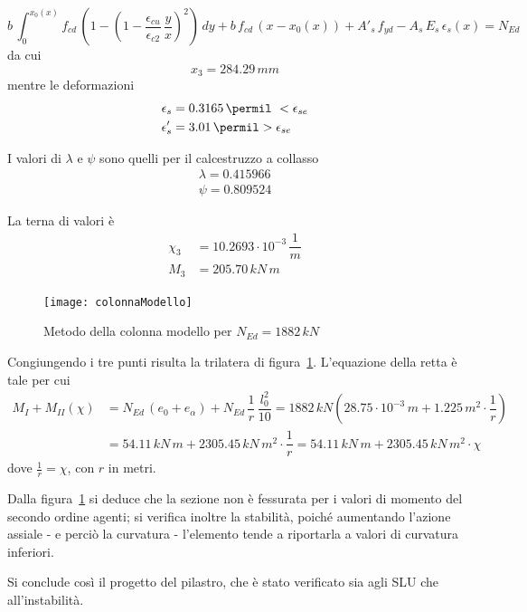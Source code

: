 \[
b\,\int_0^{x_0(x)} f_{cd}\,\left(1-\left(1-\dfrac{\epsilon_{cu}}{\epsilon_{c2}}\,\dfrac{y}{x}\right)^2\right)\,dy + b\,f_{cd}\,\left(x-x_0(x)\right) + A'_s\,f_{yd} - A_s\,E_s\,\epsilon_s(x) = N_{Ed}
\]
da cui
\[
    x_3 = 284.29\,mm
\]
mentre le deformazioni
\begin{align*}
	\epsilon_s &= 0.3165\,\permil\ < \epsilon_{se}\\
	\epsilon'_s &= 3.01\,\permil > \epsilon_{se}
\end{align*}

I valori di $\lambda$ e $\psi$ sono quelli per il calcestruzzo a collasso
\begin{align*}
    \lambda = 0.415966\\
	\psi = 0.809524
\end{align*}

La terna di valori è
\begin{align}
	\chi_3 &= 10.2693\cdot 10^{-3}\,\dfrac{1}{m}\\
	M_3 &= 205.70\,kN\,m
\end{align}

\begin{figure}
    \centering
	\texttt{[image: colonnaModello]}
	\caption{Metodo della colonna modello per $N_{Ed} = 1882\,kN$}
	\label{fig:colonnaModello}
\end{figure}

Congiungendo i tre punti risulta la trilatera di figura~\ref{fig:colonnaModello}. L'equazione della retta è tale per cui
\begin{align*}
	M_I + M_{II} (\chi) &= N_{Ed}\,(e_0 + e_\alpha) + N_{Ed}\,\dfrac{1}{r}\,\dfrac{l_0^2}{10} = 1882\,kN \left(28.75\cdot 10^{-3}\,m + 1.225\,m^2\cdot \dfrac{1}{r}\right)\\
	&= 54.11\,kN\,m + 2305.45\,kN\,m^2\cdot \dfrac{1}{r} = 54.11\,kN\,m + 2305.45\,kN\,m^2\cdot \chi
\end{align*}
dove $\frac{1}{r} = \chi$, con $r$ in metri.

Dalla figura~\ref{fig:colonnaModello} si deduce che la sezione non è fessurata per i valori di momento del secondo ordine agenti; si verifica inoltre la stabilità, poiché aumentando l'azione assiale - e perciò la curvatura - l'elemento tende a riportarla a valori di curvatura inferiori.

Si conclude così il progetto del pilastro, che è stato verificato sia agli SLU che all'instabilità.
\cleardoublepage
